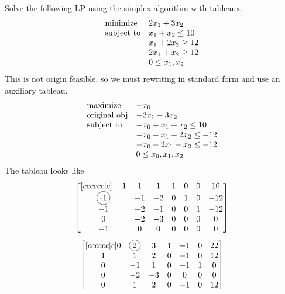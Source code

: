 \documentclass[12pt]{article}
\newcommand*\circled[1]{\tikz[baseline=(char.base)]{
		\node[shape=circle,draw,inner sep=2pt] (char) {#1};}}
\newenvironment{exercise}[2][Exercise]{\begin{trivlist}
		\item[\hskip \labelsep {\bfseries #1}\hskip \labelsep {\bfseries #2.}]}{\end{trivlist}}
\begin{document}
\begin{exercise}{1} Solve the following LP using the simplex algorithm with tableaux.
\begin{equation*}
\begin{array}{ll@{}ll}
\text{minimize}  & \displaystyle 2x_1+3x_2 &\\
\text{subject to}& \displaystyle x_1+x_2 \leq 10   \\
                 & \displaystyle x_1+2x_2 \geq 12 \\
                 & \displaystyle 2x_1+x_2 \geq 12 \\
                 & \displaystyle 0 \leq x_1,x_2
\end{array}
\end{equation*}
This is not origin feasible, so we must rewriting in standard form and use an auxiliary tableau.
\begin{equation*}
	\begin{array}{ll@{}ll}
		\text{maximize}  & \displaystyle -x_0 &\\
		\text{original obj}  & \displaystyle -2x_1-3x_2 &\\
		\text{subject to}& \displaystyle -x_0+x_1+x_2 \leq 10   \\
		& \displaystyle -x_0-x_1-2x_2 \leq -12 \\
		& \displaystyle -x_0-2x_1-x_2 \leq -12 \\
		& \displaystyle 0 \leq x_0,x_1,x_2
	\end{array}
\end{equation*}
The tableau looks like
\[\begin{bmatrix}[cccccc|c]
	-1 &  1 &  1 & 1 & 0 & 0 &  10\\
	\circled{-1} & -1 & -2 & 0 & 1 & 0 & -12\\
	-1 & -2 & -1 & 0 & 0 & 1 & -12\\
	 0 & -2 & -3 & 0 & 0 & 0 &  0\\
	-1 &  0 &  0 & 0 & 0 & 0 &  0\\
\end{bmatrix}\]
\[\begin{bmatrix}[cccccc|c]
	 0 &  \circled{2} &  3 & 1 & -1 & 0 & 22\\
	 1 &  1 &  2 & 0 & -1 & 0 & 12\\
	 0 & -1 &  1 & 0 & -1 & 1 &  0\\
	 0 & -2 & -3 & 0 &  0 & 0 &  0\\
	 0 &  1 &  2 & 0 & -1 & 0 &  12\\
\end{bmatrix}\]

\end{exercise}
\end{document}

